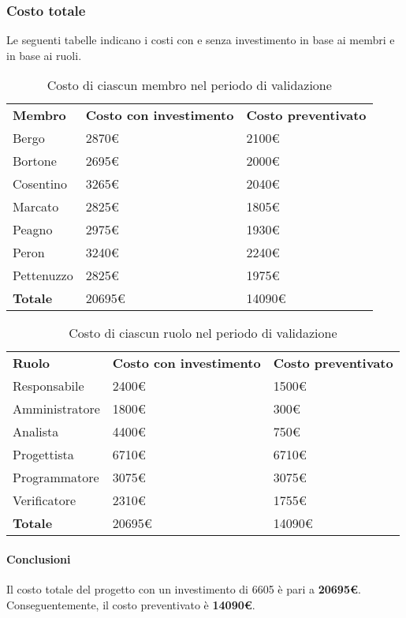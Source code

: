 	\subsubsection{Costo totale}
		Le seguenti tabelle indicano i costi con e senza investimento in base ai membri e in base ai ruoli.
		\begin{table}[h]
			\centering
			\begin{tabular}{| l | l | l |}
				\rowcolor{LightBlue}
				\textbf{\color{white}Membro}
				& \textbf{\color{white}Costo con investimento}
				& \textbf{\color{white}Costo preventivato}\\
				
				Bergo				& 2870€ & 2100€\\
				Bortone			& 2695€ & 2000€\\
				Cosentino		& 3265€ & 2040€\\
				Marcato			& 2825€ & 1805€\\
				Peagno				& 2975€ & 1930€\\
				Peron				& 3240€ & 2240€\\
				Pettenuzzo		& 2825€ & 1975€\\ \hline
				\textbf{Totale} & 20695€ & 14090€\\ \hline
			\end{tabular}
			\caption{Costo di ciascun membro nel periodo di validazione}
		\end{table}
		
		\begin{table}[h]
			\centering
			\begin{tabular}{| l | l | l |}
				\rowcolor{LightBlue}
				\textbf{\color{white}Ruolo}
				& \textbf{\color{white}Costo con investimento}
				& \textbf{\color{white}Costo preventivato}\\
				
				Responsabile 		& 2400€ & 1500€\\
				Amministratore 	& 1800€ & 300€\\
				Analista 				& 4400€ & 750€\\			
				Progettista 			& 6710€ & 6710€\\
				Programmatore 		& 3075€ & 3075€\\
				Verificatore 		& 2310€ & 1755€\\ \hline
				\textbf{Totale} 	& 20695€ & 14090€\\ \hline
			\end{tabular}		
			\caption{Costo di ciascun ruolo nel periodo di validazione}
		\end{table}
		
		\paragraph{Conclusioni\\}
		Il costo totale del progetto con un investimento di 6605 è pari a \textbf{20695€}. Conseguentemente, il costo preventivato è \textbf{14090€}.